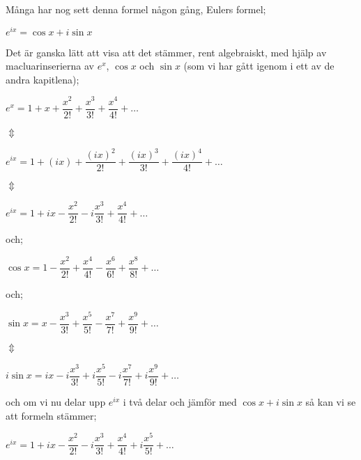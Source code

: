 \documentclass[10pt, a4paper]{amsart}
\begin{document}
Många har nog sett denna formel någon gång, Eulers formel;
\vspace{24pt plus 4pt minus 4pt}

\hspace{5ex}
$ e^{ix} = \cos x + i\sin x $
\bigskip
\bigskip

Det är ganska lätt att visa att det stämmer, rent algebraiskt, med hjälp av macluarinserierna av $ e^x $, $ \cos x $ och $ \sin x $ (som vi har gått igenom i ett av de andra kapitlena);
\vspace{24pt plus 4pt minus 4pt}

\hspace{5ex}
$ e^x = 1 + x + \dfrac{x^2}{2!} + \dfrac{x^3}{3!} + \dfrac{x^4}{4!} + \dotso $
\bigskip

\hspace{10ex}
$ \Updownarrow $
\bigskip

\hspace{5ex}
$ e^{ix} = 1 + (ix) + \dfrac{(ix)^2}{2!} + \dfrac{(ix)^3}{3!} + \dfrac{(ix)^4}{4!} + \dotso $
\bigskip

\hspace{10ex}
$ \Updownarrow $
\bigskip

\hspace{5ex}
$ e^{ix} = 1 + ix - \dfrac{x^2}{2!} - i\dfrac{x^3}{3!} + \dfrac{x^4}{4!} + \dotso $
\vspace{24pt plus 4pt minus 4pt} 

och;
\bigskip

\bigskip
\hspace{5ex}
$ \cos x = 1 - \dfrac{x^2}{2!} + \dfrac{x^4}{4!} - \dfrac{x^6}{6!} + \dfrac{x^8}{8!} + \dotso $
\bigskip

och;
\vspace{24pt plus 4pt minus 4pt} 

\hspace{5ex}
$ \sin x = x - \dfrac{x^3}{3!} + \dfrac{x^5}{5!} - \dfrac{x^7}{7!} + \dfrac{x^9}{9!} + \dotso $
\bigskip

\hspace{10ex}
$ \Updownarrow $
\bigskip

\hspace{5ex}
$ i\sin x = ix - i\dfrac{x^3}{3!} + i\dfrac{x^5}{5!} - i\dfrac{x^7}{7!} + i\dfrac{x^9}{9!} + \dotso $
\bigskip
\bigskip

och om vi nu delar upp $ e^{ix} $ i två delar och jämför med $ \cos x + i\sin x $ så kan vi se att formeln stämmer;
\bigskip

\bigskip
\hspace{5ex}
$ e^{ix} = 1 + ix - \dfrac{x^2}{2!} - i\dfrac{x^3}{3!} + \dfrac{x^4}{4!} + i\dfrac{x^5}{5!} + \dotso $
\bigskip
\end{document}
